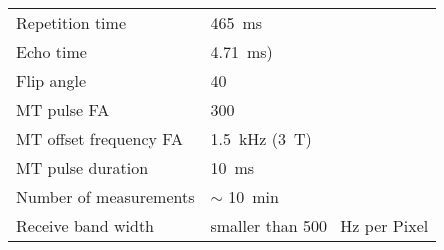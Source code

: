 \begin{table}[H]
\begin{tabularx}{\linewidth}{@{} s | X @{}}
Repetition time	                                                            	& \num[round-precision = 0, round-mode = places]{465}\SI{}{\milli\second}\\
Echo time	                                                                        	& \SI{4.71}{\milli\second})                                          \\
Flip angle                                                                                 	& 40                                          \\
MT pulse FA									& 300 					\\
MT offset frequency FA							& \SI{1.5}{\kilo\hertz} (\SI{3}{\tesla})\\
MT pulse duration 								& \num[round-precision = 0, round-mode = places]{10}\SI{}{\milli\second}\\
Number of measurements                                                  & $\sim$ \num[round-precision = 0, round-mode = places]{10}\SI{}{\minute}     \\
Receive band width 							& smaller than \num[round-precision = 0, round-mode = places]{500} \SI{}{\hertz} per Pixel 	\\
\bottomrule
\end{tabularx}
\end{table}
